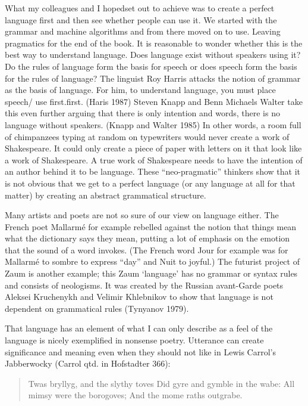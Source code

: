 What my colleagues and I hopedset out to achieve was to create a perfect language first and then see whether people can use it.  We started with the grammar and machine algorithms and from there moved on to use. Leaving pragmatics for the end of the book. It is reasonable to wonder whether this is the best way to understand language. Does language exist without speakers using it? Do the rules of language form the basis for speech or does speech form the basis for the rules of language? The linguist Roy Harris attacks the notion of grammar as the basis of language. For him, to understand language, you must place speech/ use first.first. (Haris 1987) Steven Knapp and Benn Michaels Walter take this even further arguing that there is only intention and words, there is no language without speakers. (Knapp and Walter 1985) In other words, a room full of chimpanzees typing at random on typewriters would never create a work of Shakespeare. It could only create a piece of paper with letters on it that look like a work of Shakespeare. A true work of Shakespeare needs to have the intention of an author behind it to be language. These “neo-pragmatic” thinkers show that it is not obvious that we get to a perfect language (or any language at all for that matter) by creating an abstract grammatical structure. 

Many artists and poets are not so sure of our view on language either. The French poet Mallarmé for example rebelled against the notion that things mean what the dictionary says they mean, putting a lot of emphasis on the emotion that the sound of a word invokes. (The French word Jour for example was for Mallarmé to sombre to express “day” and Nuit to joyful.) The futurist project of Zaum is another example; this Zaum ‘language’ has no grammar or syntax rules and consists of neologisms. It was created by the Russian avant-Garde poets Aleksei Kruchenykh and Velimir Khlebnikov to show that language is not dependent on grammatical rules (Tynyanov 1979).						 

That language has an element of what I can only describe as a feel of the language is nicely exemplified in nonsense poetry. Utterance can create significance and meaning even when they should not like in Lewis Carrol’s Jabberwocky (Carrol qtd. in Hofstadter 366):

\begin{quote}
Twas bryllyg, and the slythy toves 
 Did gyre and gymble in the wabe: 
 All mimsy were the borogoves; 
 And the mome raths outgrabe.  
\end{quote}

